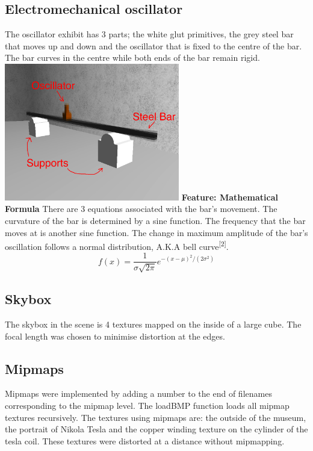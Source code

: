 \documentclass[10pt, oneside]{article}   	%
\begin{document}
\subsection{Electromechanical oscillator}
The oscillator exhibit has 3 parts; the white glut primitives, the grey steel bar that moves up and down and the oscillator that is fixed to the centre of the bar.  The bar curves in the centre while both ends of the bar remain rigid.
\vspace{2mm}
\newline
\includegraphics[height=6cm]{oscillator.png}
\newline
\newline
\textbf{Feature: Mathematical Formula}\hspace{3mm} There are 3 equations associated with the bar's movement.  The curvature of the bar is determined by a sine function.  The frequency that the bar moves at is another sine function.  The change in maximum amplitude of the bar's oscillation follows a normal distribution, A.K.A bell curve\textsuperscript{[2]}.
\begin{equation}
f(x) = \frac{1}{\sigma\sqrt{2\pi}} e^{-(x - \mu)^{2}/(2\sigma^{2}) }
\end{equation}

\subsection{Skybox}
The skybox in the scene is 4 textures mapped on the inside of a large cube.  The focal length was chosen to minimise distortion at the edges.

\subsection{Mipmaps}
Mipmaps were implemented by adding a number to the end of filenames corresponding to the mipmap level.  The loadBMP function loads all mipmap textures recursively.  The textures using mipmaps are: the outside of the museum, the portrait of Nikola Tesla and the copper winding texture on the cylinder of the tesla coil.  These textures were distorted at a distance without mipmapping.
\end{document}
